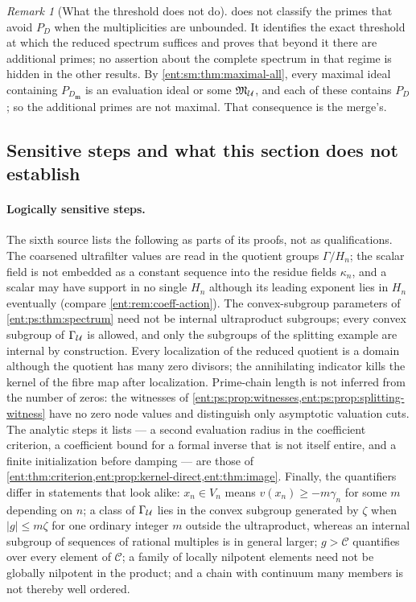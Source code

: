 \documentclass[11pt]{article}
\theoremstyle{plain}
\theoremstyle{plain}
\theoremstyle{plain}
\theoremstyle{definition}
\theoremstyle{definition}
\theoremstyle{definition}
\theoremstyle{definition}
\theoremstyle{remark}
\newtheorem{remark}[remark]{Remark}
\newcommand{\abs}[1]{\lvert#1\rvert}
\begin{document}
\begin{remark}[What the threshold does not do]
 does not classify the primes that avoid $P_D$
when the multiplicities are unbounded. It identifies the exact threshold at
which the reduced spectrum suffices and proves that beyond it there are
additional primes; no assertion about the complete spectrum in that regime is
hidden in the other results. By \cref{ent:sm:thm:maximal-all}, every maximal
ideal containing $P_{D_{\mathbf m}}$ is an evaluation ideal or some
$\mathfrak M_\mathcal U$, and each of these contains $P_D$; so the additional
primes are not maximal. That consequence is the merge's.
\end{remark}

\subsection{Sensitive steps and what this section does not establish}
\label{ent:ps:subsec:limits}

\paragraph{Logically sensitive steps.}
The sixth source lists the following as parts of its proofs, not as
qualifications. The coarsened ultrafilter values are read in the quotient
groups $\Gamma/H_n$; the scalar field is not embedded as a constant sequence
into the residue fields $\kappa_n$, and a scalar may have support in no single
$H_n$ although its leading exponent lies in $H_n$ eventually (compare
\cref{ent:rem:coeff-action}). The convex-subgroup parameters of
\cref{ent:ps:thm:spectrum} need not be internal ultraproduct subgroups; every
convex subgroup of $\Gamma_\mathcal U$ is allowed, and only the subgroups of the
splitting example are internal by construction. Every localization of the
reduced quotient is a domain although the quotient has many zero divisors;
the annihilating indicator kills the kernel of the fibre map after
localization. Prime-chain length is not inferred from the number of zeros:
the witnesses of \cref{ent:ps:prop:witnesses,ent:ps:prop:splitting-witness}
have no zero node values and distinguish only asymptotic valuation cuts. The
analytic steps it lists --- a second evaluation radius in the coefficient
criterion, a coefficient bound for a formal inverse that is not itself
entire, and a finite initialization before damping --- are those of
\cref{ent:thm:criterion,ent:prop:kernel-direct,ent:thm:image}. Finally, the
quantifiers differ in statements that look alike: $x_n\in V_n$ means
$v(x_n)\ge-m\gamma_n$ for some $m$ depending on $n$; a class of
$\Gamma_\mathcal U$ lies in the convex subgroup generated by $\zeta$ when
$\abs g\le m\zeta$ for one ordinary integer $m$ outside the ultraproduct,
whereas an internal subgroup of sequences of rational multiples is in general
larger; $g>\mathcal C$ quantifies over every element of $\mathcal C$; a
family of locally nilpotent elements need not be globally nilpotent in the
product; and a chain with continuum many members is not thereby well
ordered.
\end{document}
